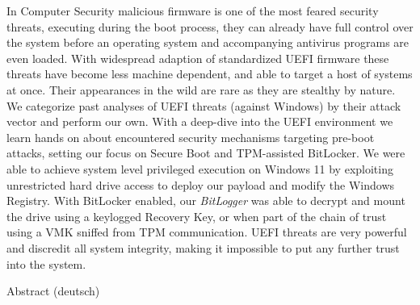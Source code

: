 

\label{sec:abstract}

In Computer Security malicious firmware is one of the most feared security threats, executing during the boot process, they can already have full control over the system before an operating system and accompanying antivirus programs are even loaded.
With widespread adaption of standardized \acs{UEFI} firmware these threats have become less machine dependent, and able to target a host of systems at once.
Their appearances in the wild are rare as they are stealthy by nature. We categorize past analyses of UEFI threats (against Windows) by their attack vector and perform our own.
With a deep-dive into the UEFI environment we learn hands on about encountered security mechanisms targeting pre-boot attacks, setting our focus on Secure Boot and TPM-assisted BitLocker.
We were able to achieve system level privileged execution on Windows 11 by exploiting unrestricted hard drive access to deploy our payload and modify the Windows Registry. With BitLocker enabled, our \emph{BitLogger} was able to decrypt and mount the drive using a keylogged Recovery Key, or when part of the chain of trust using a VMK sniffed from TPM communication.
UEFI threats are very powerful and discredit all system integrity, making it impossible to put any further trust into the system.

\vspace*{20mm}

{Abstract (deutsch)}
\label{sec:abstract-diff}

\blindtext
